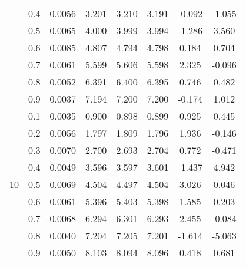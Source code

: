 \documentclass[11pt,a4paper]{report}
\begin{document}
\begin{longtable}{ | c | c || c | c | c | c | c | c | }
 & 0.4 & 0.0056 & 3.201 & 3.210 & 3.191 & -0.092 & -1.055 \\
 & 0.5 & 0.0065 & 4.000 & 3.999 & 3.994 & -1.286 & 3.560 \\
 & 0.6 & 0.0085 & 4.807 & 4.794 & 4.798 & 0.184 & 0.704 \\
 & 0.7 & 0.0061 & 5.599 & 5.606 & 5.598 & 2.325 & -0.096 \\
 & 0.8 & 0.0052 & 6.391 & 6.400 & 6.395 & 0.746 & 0.482 \\
 & 0.9 & 0.0037 & 7.194 & 7.200 & 7.200 & -0.174 & 1.012 \\
 \hline
\multirow{9}{*}{10} & 0.1 & 0.0035 & 0.900 & 0.898 & 0.899 & 0.925 & 0.445 \\
 & 0.2 & 0.0056 & 1.797 & 1.809 & 1.796 & 1.936 & -0.146 \\
 & 0.3 & 0.0070 & 2.700 & 2.693 & 2.704 & 0.772 & -0.471 \\
 & 0.4 & 0.0049 & 3.596 & 3.597 & 3.601 & -1.437 & 4.942 \\
 & 0.5 & 0.0069 & 4.504 & 4.497 & 4.504 & 3.026 & 0.046 \\
 & 0.6 & 0.0061 & 5.396 & 5.403 & 5.398 & 1.585 & 0.203 \\
 & 0.7 & 0.0068 & 6.294 & 6.301 & 6.293 & 2.455 & -0.084 \\
 & 0.8 & 0.0040 & 7.204 & 7.205 & 7.201 & -1.614 & -5.063 \\
 & 0.9 & 0.0050 & 8.103 & 8.094 & 8.096 & 0.418 & 0.681 \\
 \hline
\hline
\end{longtable}
\end{document}
